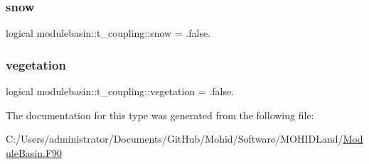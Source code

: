 \mbox{\label{structmodulebasin_1_1t__coupling_ae795d24b7b47dae99b43d6781de8209c}} 
\subsubsection{\texorpdfstring{snow}{snow}}
{\footnotesize\ttfamily logical modulebasin\+::t\+\_\+coupling\+::snow = .false.\hspace{0.3cm}{\ttfamily [private]}}

\mbox{\label{structmodulebasin_1_1t__coupling_a0b38a4bf4efd8df9fa4400d7391d6382}} 
\subsubsection{\texorpdfstring{vegetation}{vegetation}}
{\footnotesize\ttfamily logical modulebasin\+::t\+\_\+coupling\+::vegetation = .false.\hspace{0.3cm}{\ttfamily [private]}}



The documentation for this type was generated from the following file\+:\begin{DoxyCompactItemize}
\item 
C\+:/\+Users/administrator/\+Documents/\+Git\+Hub/\+Mohid/\+Software/\+M\+O\+H\+I\+D\+Land/\mbox{\hyperlink{_module_basin_8_f90}{Module\+Basin.\+F90}}\end{DoxyCompactItemize}
